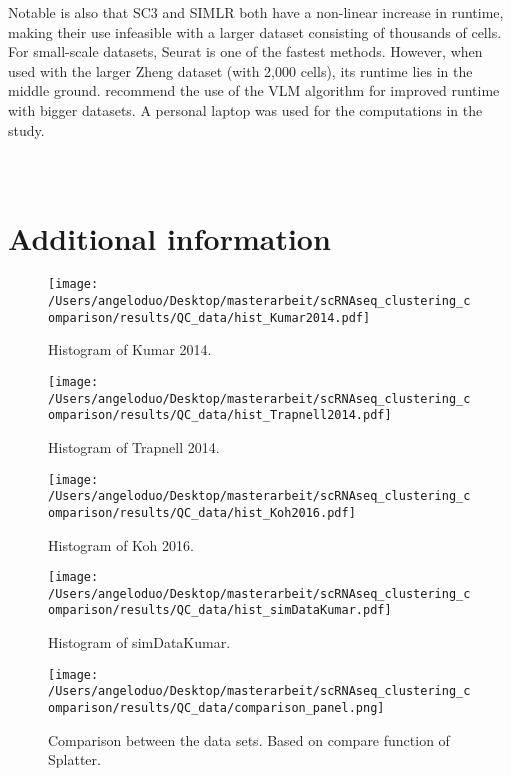\documentclass[12pt, a4paper]{article}\usepackage[]{graphicx}\usepackage[]{color}
\begin{document}
Notable is also that SC3 and SIMLR both have a non-linear increase in runtime, making their use infeasible with a larger dataset consisting of thousands of cells. For small-scale datasets, Seurat is one of the fastest methods. However, when used with the larger Zheng dataset (with 2,000 cells), its runtime lies in the middle ground. \citet{butler2017integrated} recommend the use of the VLM algorithm for improved runtime with bigger datasets. 
A personal laptop was used for the computations in the study.



\appendix 
\section{\\Additional information}

\begin{figure}[!h]
\texttt{[image: /Users/angeloduo/Desktop/masterarbeit/scRNAseq\_clustering\_comparison/results/QC\_data/hist\_Kumar2014.pdf]}
\caption{Histogram of Kumar 2014.}
\label{fig:histkumar}
\end{figure}

\begin{figure}[!h]
\texttt{[image: /Users/angeloduo/Desktop/masterarbeit/scRNAseq\_clustering\_comparison/results/QC\_data/hist\_Trapnell2014.pdf]}
\caption{Histogram of Trapnell 2014. }
\label{fig:histtrap}
\end{figure}

\begin{figure}[!h]
\texttt{[image: /Users/angeloduo/Desktop/masterarbeit/scRNAseq\_clustering\_comparison/results/QC\_data/hist\_Koh2016.pdf]}
\caption{Histogram of Koh 2016. }
\label{fig:histkoh}
\end{figure}


\begin{figure}[!h]
\texttt{[image: /Users/angeloduo/Desktop/masterarbeit/scRNAseq\_clustering\_comparison/results/QC\_data/hist\_simDataKumar.pdf]}
\caption{Histogram of simDataKumar. }
\label{fig:histsim}
\end{figure}



\begin{figure}[!h]
\texttt{[image: /Users/angeloduo/Desktop/masterarbeit/scRNAseq\_clustering\_comparison/results/QC\_data/comparison\_panel.png]}
\caption{Comparison between the data sets. Based on compare function of Splatter.}
\label{fig:compare}
\end{figure}
\end{document}
